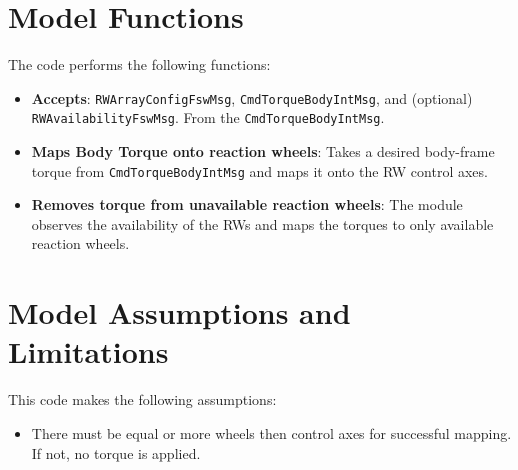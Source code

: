 \section{Model Functions}
The code performs the following functions:
\begin{itemize}
	\item \textbf{Accepts}: \verb~RWArrayConfigFswMsg~, \verb~CmdTorqueBodyIntMsg~, and (optional) \verb~RWAvailabilityFswMsg~. From the  \verb~CmdTorqueBodyIntMsg~.
	\item \textbf{Maps Body Torque onto reaction wheels}: Takes a desired body-frame torque from  \verb~CmdTorqueBodyIntMsg~ and maps it onto the RW control axes. 
	\item \textbf{Removes torque from unavailable reaction wheels}: The module observes the availability of the RWs and maps the torques to only available reaction wheels. 
\end{itemize}


\section{Model Assumptions and Limitations}
This code makes the following assumptions:
\begin{itemize}
	\item There must be equal or more wheels then control axes for successful mapping. If not, no torque is applied. 
\end{itemize}
